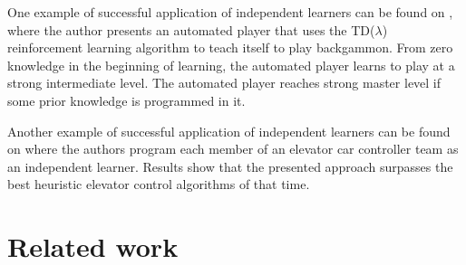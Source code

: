 \documentclass{RITA}
\begin{document}
One example of successful application of independent learners can be found on \cite{Tesauro1994}, where the author presents an automated player that uses the TD($\lambda$) reinforcement learning algorithm \cite{Sutton1988} to teach itself to play backgammon. From zero knowledge in the beginning of learning, the automated player learns to play at a strong intermediate level. The automated player reaches strong master level if some prior knowledge is programmed in it. 

Another example of successful application of independent learners can be found on \cite{Crites&Barto1998} where the authors program each member of an elevator car controller team as an independent learner. Results show that the presented approach surpasses the best heuristic elevator control algorithms of that time.




\section{Related work}
\label{sec:related}



\end{document}

